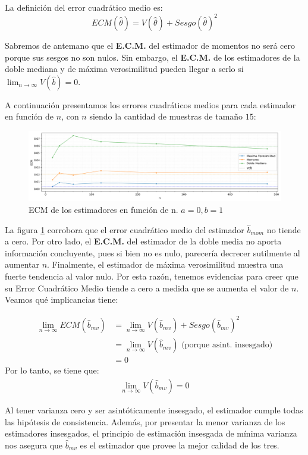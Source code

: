 La definición del error cuadrático medio es:
\begin{displaymath}
	ECM(\hat{\theta}) = V(\hat{\theta}) + Sesgo(\hat{\theta})^2
\end{displaymath}

Sabremos de antemano que el \textbf{E.C.M.} del estimador de momentos no será cero porque sus sesgos no son nulos. Sin embargo, el \textbf{E.C.M.} de los estimadores de la doble mediana y de máxima verosimilitud pueden llegar a serlo si $\lim_{n \to \infty} V(\hat{b}) = 0$.

\vskip 8pt

A continuación presentamos los errores cuadráticos medios para cada estimador en función de $n$, con $n$ siendo la cantidad de muestras de tamaño $15$:

\begin{figure}[H]
	\centering
	\includegraphics[width=1\textwidth]{imagenes/ecm-en-f-de-n.png}
	\caption{\footnotesize ECM de los estimadores en función de n. $a=0, b=1$}
	\label{fig:ej7-ecm-en-f-de-n}
\end{figure}

La figura \ref{fig:ej7-ecm-en-f-de-n} corrobora que el error cuadrático medio del estimador $\hat{b}_{mom}$ no tiende a cero. Por otro lado, el \textbf{E.C.M.} del estimador de la doble media no aporta información concluyente, pues si bien no es nulo, parecería decrecer sutilmente al aumentar $n$. Finalmente, el estimador de máxima verosimilitud muestra  una fuerte tendencia al valor nulo. Por esta razón, tenemos evidencias para creer que su Error Cuadrático Medio tiende a cero a medida que se aumenta el valor de $n$. Veamos qué implicancias tiene:

\vskip 8pt

\begin{align*}
	\lim_{n \to \infty} ECM(\hat{b}_{mv}) &= \lim_{n \to \infty} V(\hat{b}_{mv}) + Sesgo(\hat{b}_{mv})^2 \\
										  &= \lim_{n \to \infty} V(\hat{b}_{mv}) \text{ (porque asint. insesgado)} \\
										  &= 0
\end{align*}
Por lo tanto, se tiene que:
\begin{align*}
	\lim_{n \to \infty} V(\hat{b}_{mv}) = 0
\end{align*}

Al tener varianza cero y ser asintóticamente insesgado, el estimador cumple todas las hipótesis de consistencia. Además, por presentar la menor varianza de los estimadores insesgados, el principio de estimación insesgada de mínima varianza nos asegura que $\hat{b}_{mv}$ es el estimador que provee la mejor calidad de los tres.